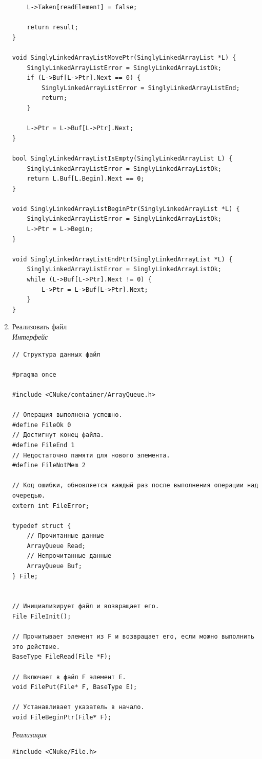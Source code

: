 \documentclass[a4paper,14pt]{extarticle}
\begin{document}
\begin{enumerate}
\begin{verbatim}
    L->Taken[readElement] = false;

    return result;
}

void SinglyLinkedArrayListMovePtr(SinglyLinkedArrayList *L) {
    SinglyLinkedArrayListError = SinglyLinkedArrayListOk;
    if (L->Buf[L->Ptr].Next == 0) {
        SinglyLinkedArrayListError = SinglyLinkedArrayListEnd;
        return;
    }

    L->Ptr = L->Buf[L->Ptr].Next;
}

bool SinglyLinkedArrayListIsEmpty(SinglyLinkedArrayList L) {
    SinglyLinkedArrayListError = SinglyLinkedArrayListOk;
    return L.Buf[L.Begin].Next == 0;
}

void SinglyLinkedArrayListBeginPtr(SinglyLinkedArrayList *L) {
    SinglyLinkedArrayListError = SinglyLinkedArrayListOk;
    L->Ptr = L->Begin;
}

void SinglyLinkedArrayListEndPtr(SinglyLinkedArrayList *L) {
    SinglyLinkedArrayListError = SinglyLinkedArrayListOk;
    while (L->Buf[L->Ptr].Next != 0) {
        L->Ptr = L->Buf[L->Ptr].Next;
    }
}
    \end{verbatim}
    \item Реализовать файл\\
	\textit{Интерфейс}
    \begin{verbatim}
// Структура данных файл

#pragma once

#include <CNuke/container/ArrayQueue.h>

// Операция выполнена успешно.
#define FileOk 0
// Достигнут конец файла.
#define FileEnd 1
// Недостаточно памяти для нового элемента.
#define FileNotMem 2

// Код ошибки, обновляется каждый раз после выполнения операции над очередью.
extern int FileError;

typedef struct {
    // Прочитанные данные
    ArrayQueue Read;
    // Непрочитанные данные
    ArrayQueue Buf;
} File;


// Инициализирует файл и возвращает его.
File FileInit();

// Прочитывает элемент из F и возвращает его, если можно выполнить это действие. 
BaseType FileRead(File *F);

// Включает в файл F элемент E.
void FilePut(File* F, BaseType E);

// Устанавливает указатель в начало.
void FileBeginPtr(File* F);
    \end{verbatim}
    \textit{Реализация}
\begin{verbatim}
#include <CNuke/File.h>


\end{verbatim}
\end{enumerate}
\end{document}
